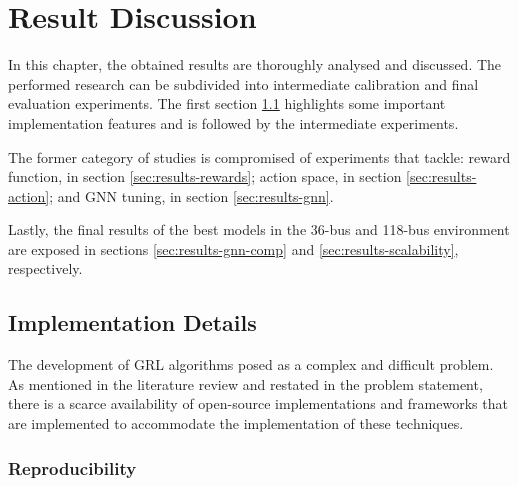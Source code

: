 \chapter{Result Discussion} \label{chap:results}

In this chapter, the obtained results are thoroughly analysed and discussed. The performed research can be subdivided into intermediate calibration and final evaluation experiments. The first section \ref{sec:results-implementation} highlights some important implementation features and is followed by the intermediate experiments. \par
The former category of studies is compromised of experiments that tackle: reward function, in section \ref{sec:results-rewards}; action space, in section \ref{sec:results-action}; and \ac{GNN} tuning, in section \ref{sec:results-gnn}. \par
Lastly, the final results of the best models in the 36-bus and 118-bus environment are exposed in sections \ref{sec:results-gnn-comp} and \ref{sec:results-scalability}, respectively.

\section{Implementation Details} \label{sec:results-implementation}

The development of \ac{GRL} algorithms posed as a complex and difficult problem. As mentioned in the literature review and restated in the problem statement, there is a scarce availability of open-source implementations and frameworks that are implemented to accommodate the implementation of these techniques. 

\subsection{Reproducibility}

